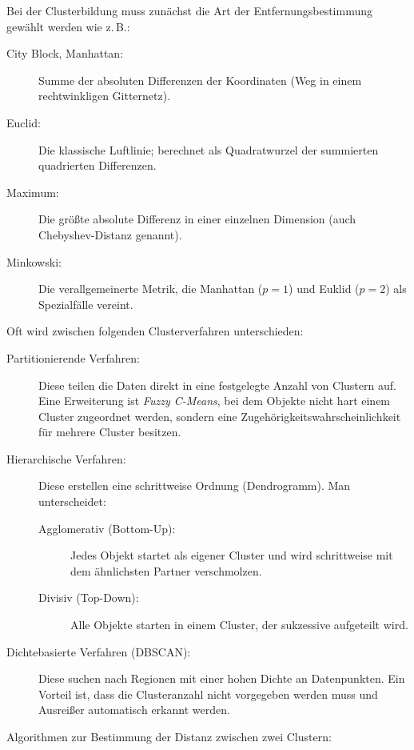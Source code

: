 \documentclass[10pt,twocolumn]{scrartcl}
\begin{document}
Bei der Clusterbildung muss zunächst die Art der Entfernungsbestimmung gewählt werden wie z.\,B.:
\begin{description}
\item[City Block, Manhattan:] Summe der absoluten Differenzen der Koordinaten (Weg in einem rechtwinkligen Gitternetz).
\item[Euclid:] Die klassische Luftlinie; berechnet als Quadratwurzel der summierten quadrierten Differenzen.
\item[Maximum:] Die größte absolute Differenz in einer einzelnen Dimension (auch Chebyshev-Distanz genannt).
\item[Minkowski:] Die verallgemeinerte Metrik, die Manhattan ($p=1$) und Euklid ($p=2$) als Spezialfälle vereint.
\end{description}

Oft wird zwischen folgenden Clusterverfahren unterschieden:

\begin{description}
\item[Partitionierende Verfahren:] Diese teilen die Daten direkt in eine festgelegte Anzahl von Clustern auf. Eine Erweiterung ist \emph{Fuzzy C-Means}, bei dem Objekte nicht hart einem Cluster zugeordnet werden, sondern eine Zugehörigkeitswahrscheinlichkeit für mehrere Cluster besitzen.
\item[Hierarchische Verfahren:] Diese erstellen eine schrittweise Ordnung (Dendrogramm). Man unterscheidet:
  \begin{description}
  \item[Agglomerativ (Bottom-Up):] Jedes Objekt startet als eigener Cluster und wird schrittweise mit dem ähnlichsten Partner verschmolzen.
  \item[Divisiv (Top-Down):] Alle Objekte starten in einem Cluster, der sukzessive aufgeteilt wird.
  \end{description}
\item[Dichtebasierte Verfahren (DBSCAN):] Diese suchen nach Regionen mit einer hohen Dichte an Datenpunkten. Ein Vorteil ist, dass die Clusteranzahl nicht vorgegeben werden muss und Ausreißer automatisch erkannt werden.
\end{description}

Algorithmen zur Bestimmung der Distanz zwischen zwei Clustern:
\end{document}

